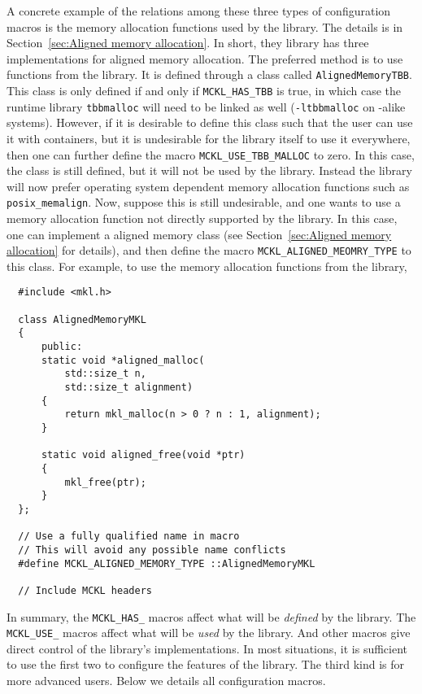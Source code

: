A concrete example of the relations among these three types of configuration
macros is the memory allocation functions used by the library. The details is
in Section~\ref{sec:Aligned memory allocation}. In short, they library has
three implementations for aligned memory allocation. The preferred method is to
use functions from the \tbb library. It is defined through a class called
\verb|AlignedMemoryTBB|. This class is only defined if and only if
\verb|MCKL_HAS_TBB| is true, in which case the runtime library \verb|tbbmalloc|
will need to be linked as well (\verb|-ltbbmalloc| on \unix-alike systems).
However, if it is desirable to define this class such that the user can use it
with \stl containers, but it is undesirable for the library itself to use it
everywhere, then one can further define the macro \verb|MCKL_USE_TBB_MALLOC| to
zero. In this case, the class is still defined, but it will not be used by the
library. Instead the library will now prefer operating system dependent memory
allocation functions such as \verb|posix_memalign|. Now, suppose this is still
undesirable, and one wants to use a memory allocation function not directly
supported by the library. In this case, one can implement a aligned memory
class (see Section~\ref{sec:Aligned memory allocation} for details), and then
define the macro \verb|MCKL_ALIGNED_MEOMRY_TYPE| to this class. For example, to
use the memory allocation functions from the \mkl library,
\begin{Verbatim}
  #include <mkl.h>

  class AlignedMemoryMKL
  {
      public:
      static void *aligned_malloc(
          std::size_t n,
          std::size_t alignment)
      {
          return mkl_malloc(n > 0 ? n : 1, alignment);
      }

      static void aligned_free(void *ptr)
      {
          mkl_free(ptr);
      }
  };

  // Use a fully qualified name in macro
  // This will avoid any possible name conflicts
  #define MCKL_ALIGNED_MEMORY_TYPE ::AlignedMemoryMKL

  // Include MCKL headers
\end{Verbatim}
In summary, the \verb|MCKL_HAS_| macros affect what will be \emph{defined} by
the library. The \verb|MCKL_USE_| macros affect what will be \emph{used} by the
library. And other macros give direct control of the library's implementations.
In most situations, it is sufficient to use the first two to configure the
features of the library. The third kind is for more advanced users. Below we
details all configuration macros.

